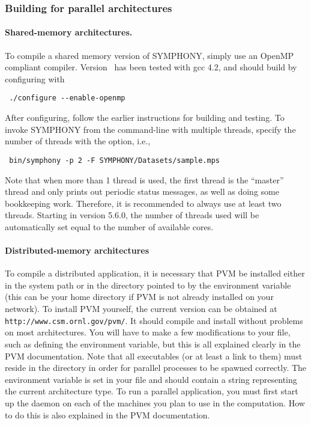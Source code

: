 \subsubsection{Building for parallel architectures}

\paragraph{Shared-memory architectures.}

To compile a shared memory version of SYMPHONY, simply use an OpenMP compliant
compiler. Version \VER\  has been tested with gcc 4.2, and should build by
configuring with
{\color{Brown}
\begin{verbatim}
 ./configure --enable-openmp
\end{verbatim}
} 
After configuring, follow the earlier instructions for building and testing.
To invoke SYMPHONY from the command-line with multiple threads, specify the
number of threads with the  option, i.e., {\color{Brown}
\begin{verbatim}
 bin/symphony -p 2 -F SYMPHONY/Datasets/sample.mps
\end{verbatim}
}
Note that when more than 1 thread is used, the first thread is the ``master''
thread and only prints out periodic status messages, as well as doing some
bookkeeping work. Therefore, it is recommended to always use at least two
threads. Starting in version 5.6.0, the number of threads used will be
automatically set equal to the number of available cores.

\paragraph{Distributed-memory architectures}
\label{distributed-build}

\label{PVM}
To compile a distributed application, it is necessary that PVM be installed
either in the system path or in the directory pointed to by the environment
variable  (this can be your home directory if PVM is not
already installed on your network). To install PVM yourself, the current
version can be obtained at \texttt{
{http://www.csm.ornl.gov/pvm/}}. It should compile and install without
problems on most architectures. You will have to make a few modifications to
your  file, such as defining the  environment
variable, but this is all explained clearly in the PVM documentation. Note
that all executables (or at least a link to them) must reside in the
 directory in order for parallel processes
to be spawned correctly. The environment variable  is set in
your  file and should contain a string representing the current
architecture type. To run a parallel application, you must first start up the
daemon on each of the machines you plan to use in the computation. How to do
this is also explained in the PVM documentation.


